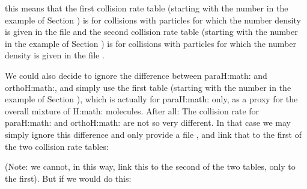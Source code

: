 \documentclass[letterpaper,10pt,english]{sphinxmanual}
\begin{document}
this means that the first collision rate table (starting with the number
 in the example of Section {\hyperref[\detokenize{lineradtrans:sec-leiden-format}]{}}) is for
collisions with particles for which the number density is given in the file
 and the second collision rate table (starting with the
number  in the example of Section {\hyperref[\detokenize{lineradtrans:sec-leiden-format}]{}}) is for
collisions with particles for which the number density is given in the file
.

We could also decide to ignore the difference between para\sphinxhyphen{}H:math: and
ortho\sphinxhyphen{}H:math:, and simply use the first table (starting with the number
 in the example of Section {\hyperref[\detokenize{lineradtrans:sec-leiden-format}]{}}),
which is actually for para\sphinxhyphen{}H:math: only, as a proxy for the overall mixture
of H:math: molecules. After all: The collision rate for para\sphinxhyphen{}H:math: and
ortho\sphinxhyphen{}H:math: are not so very different. In that case we may simply ignore
this difference and only provide a file ,
and link that to the first of the two collision rate tables:

\begin{sphinxVerbatim}[commandchars=\\\{\}]
            
\end{sphinxVerbatim}

(Note: we cannot, in this way, link this to the second of the two tables,
only to the first). But if we would do this:

\begin{sphinxVerbatim}[commandchars=\\\{\}]
            
\end{sphinxVerbatim}
\end{document}
